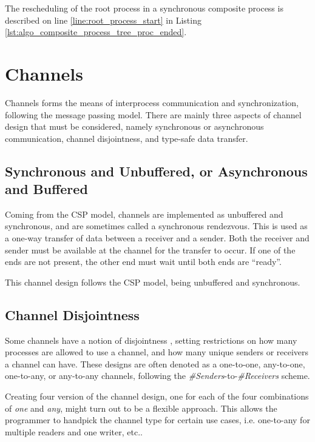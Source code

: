 The rescheduling of the root process in a synchronous composite process is described on line \ref{line:root_process_start} in Listing \ref{lst:algo_composite_process_tree_proc_ended}.

\section{Channels}

Channels forms the means of interprocess communication and synchronization, following the message passing model. There are mainly three aspects of channel design that must be considered, namely synchronous or asynchronous communication, channel disjointness, and type\hyp{}safe data transfer. 

\subsection{Synchronous and Unbuffered, or Asynchronous and Buffered}

Coming from the CSP model, channels are implemented as unbuffered and synchronous, and are sometimes called a synchronous rendezvous. This is used as a one\hyp{}way transfer of data between a receiver and a sender. Both the receiver and sender must be available at the channel for the transfer to occur. If one of the ends are not present, the other end must wait until both ends are ``ready''.

This channel design follows the CSP model, being unbuffered and synchronous.

\subsection{Channel Disjointness}

Some channels have a notion of disjointness \citep[see][chapter 3.3.1]{xc}, setting restrictions on how many processes are allowed to use a channel, and how many unique senders or receivers a channel can have. These designs are often denoted as a one\hyp{}to\hyp{}one, any\hyp{}to\hyp{}one, one\hyp{}to\hyp{}any, or any\hyp{}to\hyp{}any channels, following the \textit{\#Senders}\hyp{}to\hyp{}\textit{\#Receivers} scheme.

Creating four version of the channel design, one for each of the four combinations of \textit{one} and \textit{any}, might turn out to be a flexible approach. This allows the programmer to handpick the channel type for certain use cases, i.e.  one\hyp{}to\hyp{}any for multiple readers and one writer, etc.. 

